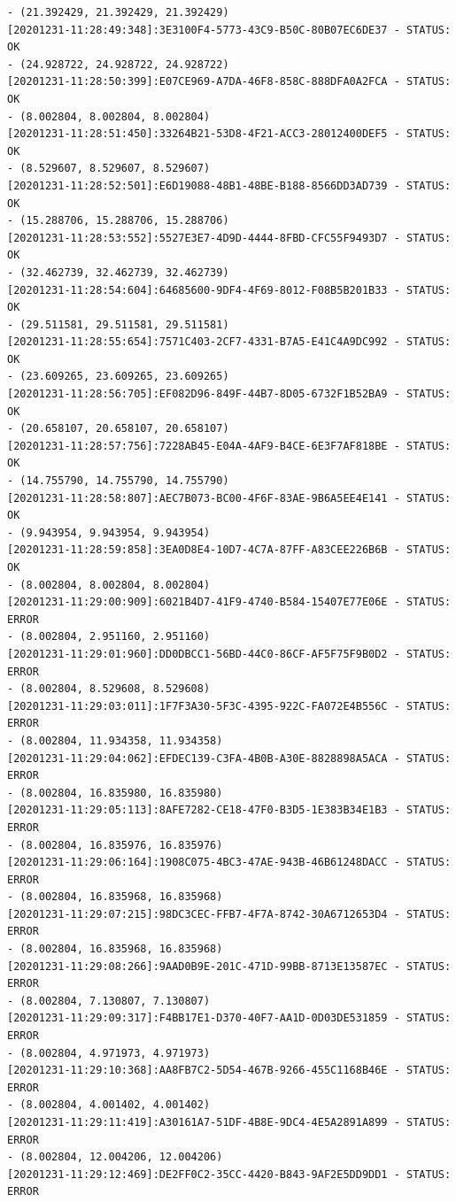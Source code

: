 \documentclass[11pt, oneside]{article}   	%
\begin{document}
\begin{Verbatim}[frame=topline,
			framesep=4mm,
			label=\fbox{\Large{STATUS\_20201231.log}}]
- (21.392429, 21.392429, 21.392429)
[20201231-11:28:49:348]:3E3100F4-5773-43C9-B50C-80B07EC6DE37 - STATUS: OK        
- (24.928722, 24.928722, 24.928722)
[20201231-11:28:50:399]:E07CE969-A7DA-46F8-858C-888DFA0A2FCA - STATUS: OK        
- (8.002804, 8.002804, 8.002804)
[20201231-11:28:51:450]:33264B21-53D8-4F21-ACC3-28012400DEF5 - STATUS: OK        
- (8.529607, 8.529607, 8.529607)
[20201231-11:28:52:501]:E6D19088-48B1-48BE-B188-8566DD3AD739 - STATUS: OK        
- (15.288706, 15.288706, 15.288706)
[20201231-11:28:53:552]:5527E3E7-4D9D-4444-8FBD-CFC55F9493D7 - STATUS: OK        
- (32.462739, 32.462739, 32.462739)
[20201231-11:28:54:604]:64685600-9DF4-4F69-8012-F08B5B201B33 - STATUS: OK        
- (29.511581, 29.511581, 29.511581)
[20201231-11:28:55:654]:7571C403-2CF7-4331-B7A5-E41C4A9DC992 - STATUS: OK        
- (23.609265, 23.609265, 23.609265)
[20201231-11:28:56:705]:EF082D96-849F-44B7-8D05-6732F1B52BA9 - STATUS: OK        
- (20.658107, 20.658107, 20.658107)
[20201231-11:28:57:756]:7228AB45-E04A-4AF9-B4CE-6E3F7AF818BE - STATUS: OK        
- (14.755790, 14.755790, 14.755790)
[20201231-11:28:58:807]:AEC7B073-BC00-4F6F-83AE-9B6A5EE4E141 - STATUS: OK        
- (9.943954, 9.943954, 9.943954)
[20201231-11:28:59:858]:3EA0D8E4-10D7-4C7A-87FF-A83CEE226B6B - STATUS: OK        
- (8.002804, 8.002804, 8.002804)
[20201231-11:29:00:909]:6021B4D7-41F9-4740-B584-15407E77E06E - STATUS: ERROR     
- (8.002804, 2.951160, 2.951160)
[20201231-11:29:01:960]:DD0DBCC1-56BD-44C0-86CF-AF5F75F9B0D2 - STATUS: ERROR     
- (8.002804, 8.529608, 8.529608)
[20201231-11:29:03:011]:1F7F3A30-5F3C-4395-922C-FA072E4B556C - STATUS: ERROR     
- (8.002804, 11.934358, 11.934358)
[20201231-11:29:04:062]:EFDEC139-C3FA-4B0B-A30E-8828898A5ACA - STATUS: ERROR     
- (8.002804, 16.835980, 16.835980)
[20201231-11:29:05:113]:8AFE7282-CE18-47F0-B3D5-1E383B34E1B3 - STATUS: ERROR     
- (8.002804, 16.835976, 16.835976)
[20201231-11:29:06:164]:1908C075-4BC3-47AE-943B-46B61248DACC - STATUS: ERROR     
- (8.002804, 16.835968, 16.835968)
[20201231-11:29:07:215]:98DC3CEC-FFB7-4F7A-8742-30A6712653D4 - STATUS: ERROR     
- (8.002804, 16.835968, 16.835968)
[20201231-11:29:08:266]:9AAD0B9E-201C-471D-99BB-8713E13587EC - STATUS: ERROR     
- (8.002804, 7.130807, 7.130807)
[20201231-11:29:09:317]:F4BB17E1-D370-40F7-AA1D-0D03DE531859 - STATUS: ERROR     
- (8.002804, 4.971973, 4.971973)
[20201231-11:29:10:368]:AA8FB7C2-5D54-467B-9266-455C1168B46E - STATUS: ERROR     
- (8.002804, 4.001402, 4.001402)
[20201231-11:29:11:419]:A30161A7-51DF-4B8E-9DC4-4E5A2891A899 - STATUS: ERROR     
- (8.002804, 12.004206, 12.004206)
[20201231-11:29:12:469]:DE2FF0C2-35CC-4420-B843-9AF2E5DD9DD1 - STATUS: ERROR     

\end{Verbatim}
\end{document}
